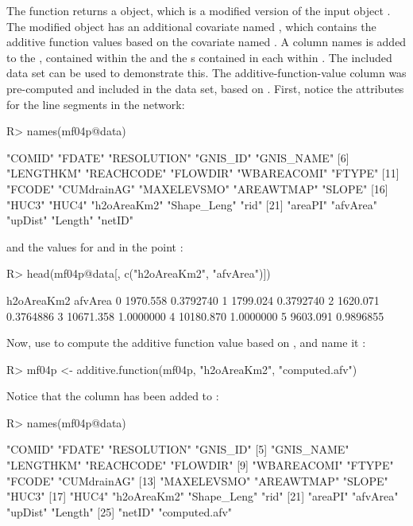 \documentclass[nojss]{jss}
\renewenvironment{Schunk}{\vspace{\topsep}}{\vspace{\topsep}}
\begin{document}
The function returns a  object, which is a
modified version of the input object . The modified object
has an additional covariate named , which contains the
additive function values based on the covariate named . 
A column names  is added to the  , contained within
the  and the 
s contained in each  within
.  The included data set can be used to demonstrate this. The additive-function-value column  was pre-computed
and included in the data set, based on . First,
notice the attributes for the line segments in the network:
\begin{Schunk}
\begin{Sinput}
R> names(mf04p@data)
\end{Sinput}
\begin{Soutput}
 [1] "COMID"      "FDATE"      "RESOLUTION" "GNIS_ID"    "GNIS_NAME" 
 [6] "LENGTHKM"   "REACHCODE"  "FLOWDIR"    "WBAREACOMI" "FTYPE"     
[11] "FCODE"      "CUMdrainAG" "MAXELEVSMO" "AREAWTMAP"  "SLOPE"     
[16] "HUC3"       "HUC4"       "h2oAreaKm2" "Shape_Leng" "rid"       
[21] "areaPI"     "afvArea"    "upDist"     "Length"     "netID"     
\end{Soutput}
\end{Schunk}
and the values for  and  in the point
:
\begin{Schunk}
\begin{Sinput}
R> head(mf04p@data[, c("h2oAreaKm2", "afvArea")])
\end{Sinput}
\begin{Soutput}
  h2oAreaKm2   afvArea
0   1970.558 0.3792740
1   1799.024 0.3792740
2   1620.071 0.3764886
3  10671.358 1.0000000
4  10180.870 1.0000000
5   9603.091 0.9896855
\end{Soutput}
\end{Schunk}
Now, use  to compute the additive function
value based on , and name it :
\begin{Schunk}
\begin{Sinput}
R> mf04p <- additive.function(mf04p, "h2oAreaKm2", "computed.afv")
\end{Sinput}
\end{Schunk}
Notice that the  column has been added to
:
\begin{Schunk}
\begin{Sinput}
R> names(mf04p@data)
\end{Sinput}
\begin{Soutput}
 [1] "COMID"        "FDATE"        "RESOLUTION"   "GNIS_ID"     
 [5] "GNIS_NAME"    "LENGTHKM"     "REACHCODE"    "FLOWDIR"     
 [9] "WBAREACOMI"   "FTYPE"        "FCODE"        "CUMdrainAG"  
[13] "MAXELEVSMO"   "AREAWTMAP"    "SLOPE"        "HUC3"        
[17] "HUC4"         "h2oAreaKm2"   "Shape_Leng"   "rid"         
[21] "areaPI"       "afvArea"      "upDist"       "Length"      
[25] "netID"        "computed.afv"
\end{Soutput}
\end{Schunk}
\end{document}
